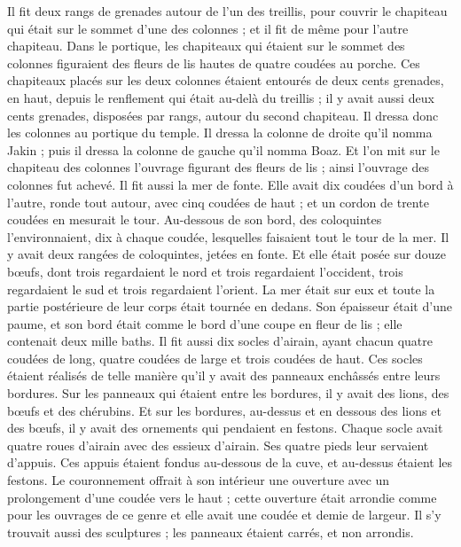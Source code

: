 \begin{multicols}{2}
Il fit deux rangs de grenades autour de l’un des treillis, pour couvrir le chapiteau qui était sur le sommet d'une des colonnes ; et il fit de même pour l'autre chapiteau.
Dans le portique, les chapiteaux qui étaient sur le sommet des colonnes figuraient des fleurs de lis hautes de quatre coudées au porche.
Ces chapiteaux placés sur les deux colonnes étaient entourés de deux cents grenades, en haut, depuis le renflement qui était au-delà du treillis ; il y avait aussi deux cents grenades, disposées par rangs, autour du second chapiteau.
Il dressa donc les colonnes au portique du temple. Il dressa la colonne de droite qu’il nomma Jakin ; puis il dressa la colonne de gauche qu’il nomma Boaz.
Et l’on mit sur le chapiteau des colonnes l'ouvrage figurant des fleurs de lis ; ainsi l'ouvrage des colonnes fut achevé.
Il fit aussi la mer de fonte. Elle avait dix coudées d'un bord à l'autre, ronde tout autour, avec cinq coudées de haut ; et un cordon de trente coudées en mesurait le tour.
Au-dessous de son bord, des coloquintes l'environnaient, dix à chaque coudée, lesquelles faisaient tout le tour de la mer. Il y avait deux rangées de coloquintes, jetées en fonte.
Et elle était posée sur douze bœufs, dont trois regardaient le nord et trois regardaient l'occident, trois regardaient le sud et trois regardaient l'orient. La mer était sur eux et toute la partie postérieure de leur corps était tournée en dedans.
Son épaisseur était d'une paume, et son bord était comme le bord d'une coupe en fleur de lis ; elle contenait deux mille baths.
Il fit aussi dix socles d'airain, ayant chacun quatre coudées de long, quatre coudées de large et trois coudées de haut.
Ces socles étaient réalisés de telle manière qu'il y avait des panneaux enchâssés entre leurs bordures.
Sur les panneaux qui étaient entre les bordures, il y avait des lions, des bœufs et des chérubins. Et sur les bordures, au-dessus et en dessous des lions et des bœufs, il y avait des ornements qui pendaient en festons.
Chaque socle avait quatre roues d'airain avec des essieux d'airain. Ses quatre pieds leur servaient d’appuis. Ces appuis étaient fondus au-dessous de la cuve, et au-dessus étaient les festons.
Le couronnement offrait à son intérieur une ouverture avec un prolongement d'une coudée vers le haut ; cette ouverture était arrondie comme pour les ouvrages de ce genre et elle avait une coudée et demie de largeur. Il s’y trouvait aussi des sculptures ; les panneaux étaient carrés, et non arrondis.

\end{multicols}
